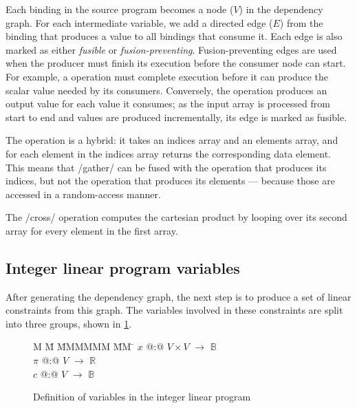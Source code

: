 

Each binding in the source program becomes a node ($V$) in the dependency graph.
For each intermediate variable, we add a directed edge ($E$) from the binding that produces a value to all bindings that consume it.
Each edge is also marked as either \emph{fusible} or \emph{fusion-preventing}.
Fusion-preventing edges are used when the producer must finish its execution before the consumer node can start.
For example, a \Hs@fold@ operation must complete execution before it can produce the scalar value needed by its consumers.
Conversely, the \Hs@map@ operation produces an output value for each value it consumes; as the input array is processed from start to end and values are produced incrementally, its edge is marked as fusible. 

The \Hs@gather@ operation is a hybrid: it takes an indices array and an elements array, and for each element in the indices array returns the corresponding data element.
This means that \Hs/gather/ can be fused with the operation that produces its indices, but not the operation that produces its elements --- because those are accessed in a random-access manner. 

The \Hs/cross/ operation computes the cartesian product by looping over its second array for every element in the first array.




\subsection{Integer linear program variables}
After generating the dependency graph, the next step is to produce a set of linear constraints from this graph.
The variables involved in these constraints are split into three groups, shown in \cref{fig:clustering:ilp-vars}.

\begin{figure}
\centering
\parbox{0cm}{
\begin{tabbing}
M   \= M \= MMMMMM \= MM \= \kill
$x$   \> @:@  \> $V \times V$ \> $\to$ \> $\mathbb{B}$ \\
$\pi$ \> @:@  \> $V$             \> $\to$ \> $\mathbb{R}$ \\
$c$   \> @:@  \> $V$             \> $\to$ \> $\mathbb{B}$
\end{tabbing}
}
\caption{Definition of variables in the integer linear program}
\label{fig:clustering:ilp-vars}
\end{figure}

